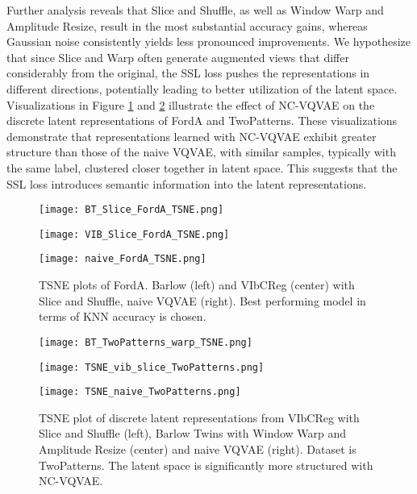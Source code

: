 \documentclass[../../thesis.tex]{subfiles}
\begin{document}
Further analysis reveals that Slice and Shuffle, as well as Window Warp and Amplitude Resize, result in the most substantial accuracy gains, whereas Gaussian noise consistently yields less pronounced improvements. We hypothesize that since Slice and Warp often generate augmented views that differ considerably from the original, the SSL loss pushes the representations in different directions, potentially leading to better utilization of the latent space. Visualizations in Figure \ref{fig:FordA_TSNE} and \ref{fig:TSNE_TwoPatterns} illustrate the effect of NC-VQVAE on the discrete latent representations of FordA and TwoPatterns. These visualizations demonstrate that representations learned with NC-VQVAE exhibit greater structure than those of the naive VQVAE, with similar samples, typically with the same label, clustered closer together in latent space. This suggests that the SSL loss introduces semantic information into the latent representations.\newline

\begin{figure}[h] 
    \centering
    \begin{minipage}[b]{0.32\textwidth}
        \centering
        \texttt{[image: BT\_Slice\_FordA\_TSNE.png]}
    \end{minipage}
    \hfill
    \begin{minipage}[b]{0.32\textwidth}
        \centering
        \texttt{[image: VIB\_Slice\_FordA\_TSNE.png]}
    \end{minipage}
    \hfill
    \begin{minipage}[b]{0.32\textwidth}
        \centering
        \texttt{[image: naive\_FordA\_TSNE.png]}
    \end{minipage}
    \caption{TSNE plots of FordA. Barlow (left) and VIbCReg (center) with Slice and Shuffle, naive VQVAE (right). Best performing model in terms of KNN accuracy is chosen. }
    \label{fig:FordA_TSNE}
\end{figure}


\begin{figure}[h]
    \centering
    \begin{minipage}[b]{0.32\textwidth}
        \centering
        \texttt{[image: BT\_TwoPatterns\_warp\_TSNE.png]}
    \end{minipage}
    \hfill
    \begin{minipage}[b]{0.32\textwidth}
        \centering
        \texttt{[image: TSNE\_vib\_slice\_TwoPatterns.png]}
    \end{minipage}
    \hfill
    \begin{minipage}[b]{0.32\textwidth}
        \centering
        \texttt{[image: TSNE\_naive\_TwoPatterns.png]}
    \end{minipage}
    \caption{TSNE plot of discrete latent representations from VIbCReg with Slice and Shuffle (left), Barlow Twins with Window Warp and Amplitude Resize (center) and naive VQVAE (right). Dataset is TwoPatterns. The latent space is significantly more structured with NC-VQVAE.}
    \label{fig:TSNE_TwoPatterns}
\end{figure}
\end{document}
